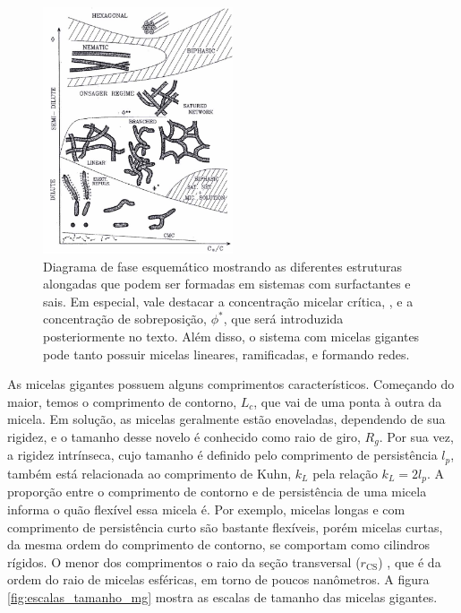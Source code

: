 		\begin{figure}[h]
			\centering
			\includegraphics[width=0.5\textwidth]{imagens/artigos/estruturas_regimes_concentracoes_cates_fielding}
			\caption{Diagrama de fase esquemático mostrando as diferentes estruturas alongadas que podem ser formadas em sistemas com surfactantes e sais. Em especial, vale destacar a concentração micelar crítica, \cmc, e a concentração de sobreposição, \(\phi^*\), que será introduzida posteriormente no texto. Além disso, o sistema com micelas gigantes pode tanto possuir micelas lineares, ramificadas, e formando redes.}
			\label{fig:regimes_e_estruturas_lequeux}
		\end{figure}     
		
		As micelas gigantes possuem alguns comprimentos característicos. Começando do maior, temos o comprimento de contorno, \(L_c\), que vai de uma ponta à outra da micela. Em solução, as micelas geralmente estão enoveladas, dependendo de sua rigidez, e o tamanho desse novelo é conhecido como raio de giro, \(R_g\).  Por sua vez, a rigidez intrínseca, cujo tamanho é definido pelo comprimento de persistência \(l_p\), também está relacionada ao comprimento de Kuhn, \(k_L\) pela relação \(k_L=2l_p\). A proporção entre o comprimento de contorno e de persistência de uma micela informa o quão flexível essa micela é. Por exemplo, micelas longas e com comprimento de persistência curto são bastante flexíveis, porém micelas curtas, da mesma ordem do comprimento de contorno, se comportam como cilindros rígidos. O menor dos comprimentos o raio da seção transversal (\(r_{\mathrm{CS}}\)) , que é da ordem do raio de micelas esféricas, em torno de poucos nanômetros. A figura \ref{fig:escalas_tamanho_mg} mostra as escalas de tamanho das micelas gigantes.
		
